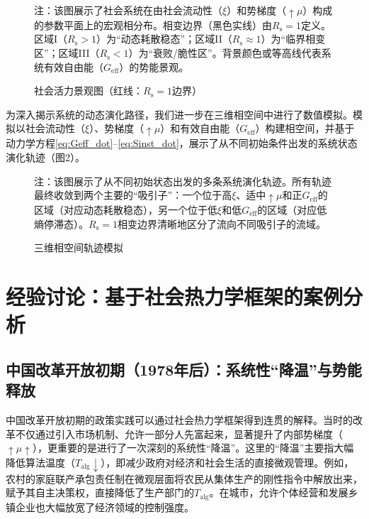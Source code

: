 \documentclass[twocolumn]{ctexart}
\newcommand{\upmu}{\uparrow\!\mu}
\newcommand{\upxi}{\xi}
\newcommand{\Talg}{T_{\mathrm{alg}}}
\newcommand{\Geff}{G_{\mathrm{eff}}}
\newcommand{\Rs}{R_{\mathrm{s}}}
\begin{document}
\begin{figure}[H]
\centering
\caption{社会活力景观图（红线：$\Rs=1$边界）}
\label{fig:landscape}
{\small 注：该图展示了社会系统在由社会流动性（$\upxi$）和势梯度（$\upmu$）构成的参数平面上的宏观相分布。相变边界（黑色实线）由$\Rs=1$定义。区域I（$\Rs>1$）为“动态耗散稳态”；区域II（$\Rs\approx1$）为“临界相变区”；区域III（$\Rs<1$）为“衰败/脆性区”。背景颜色或等高线代表系统有效自由能（$\Geff$）的势能景观。}
\end{figure}

为深入揭示系统的动态演化路径，我们进一步在三维相空间中进行了数值模拟。模拟以社会流动性（$\upxi$）、势梯度（$\upmu$）和有效自由能（$\Geff$）构建相空间，并基于动力学方程\eqref{eq:Geff_dot}--\eqref{eq:Sinst_dot}，展示了从不同初始条件出发的系统状态演化轨迹（图2）。

\begin{figure}[H]
\centering
\caption{三维相空间轨迹模拟}
\label{fig:phasespace}
{\small 注：该图展示了从不同初始状态出发的多条系统演化轨迹。所有轨迹最终收敛到两个主要的“吸引子”：一个位于高$\upxi$、适中$\upmu$和正$\Geff$的区域（对应动态耗散稳态），另一个位于低$\upxi$和低$\Geff$的区域（对应低熵停滞态）。$\Rs=1$相变边界清晰地区分了流向不同吸引子的流域。}
\end{figure}

\section{经验讨论：基于社会热力学框架的案例分析}

\subsection{中国改革开放初期（1978年后）：系统性“降温”与势能释放}

中国改革开放初期的政策实践可以通过社会热力学框架得到连贯的解释。当时的改革不仅通过引入市场机制、允许一部分人先富起来，显著提升了内部势梯度（$\upmu\uparrow$），更重要的是进行了一次深刻的系统性“降温”。这里的“降温”主要指大幅降低算法温度（$\Talg\downarrow$），即减少政府对经济和社会生活的直接微观管理。例如，农村的家庭联产承包责任制在微观层面将农民从集体生产的刚性指令中解放出来，赋予其自主决策权，直接降低了生产部门的$\Talg$。在城市，允许个体经营和发展乡镇企业也大幅放宽了经济领域的控制强度。
\end{document}
